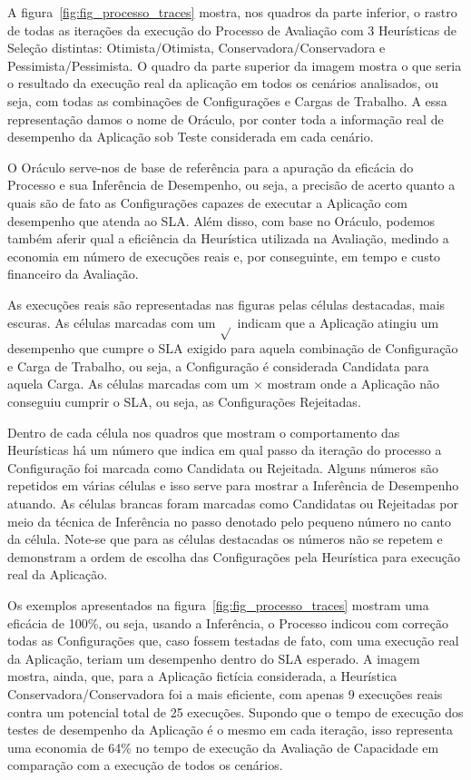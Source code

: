 A figura~\ref{fig:fig_processo_traces} mostra, nos quadros da parte inferior, 
o rastro de todas as iterações da execução do Processo de Avaliação com 3 
Heurísticas de Seleção distintas: Otimista/Otimista, Conservadora/Conservadora e 
Pessimista/Pessimista. O quadro da parte superior da imagem mostra o que seria o
resultado da execução real da aplicação em todos os cenários analisados, ou seja,
com todas as combinações de Configurações e Cargas de Trabalho. A essa 
representação damos o nome de Oráculo, por conter toda a informação real de
desempenho da Aplicação sob Teste considerada em cada cenário.

O Oráculo serve-nos de base de referência para a apuração da eficácia do Processo
e sua Inferência de Desempenho, ou seja, a precisão de acerto quanto a quais são
de fato as Configurações capazes de executar a Aplicação com desempenho que atenda
ao SLA. Além disso, com base no Oráculo, podemos também aferir qual a eficiência 
da Heurística utilizada na Avaliação, medindo a economia em número de execuções
reais e, por conseguinte, em tempo e custo financeiro da Avaliação.

As execuções reais são representadas nas figuras pelas células destacadas, mais 
escuras. As células marcadas com um $\sqrt{}$ indicam que a Aplicação atingiu um
desempenho que cumpre o SLA exigido para aquela combinação de Configuração e Carga
de Trabalho, ou seja, a Configuração é considerada Candidata para aquela Carga. As
células marcadas com um $\times$ mostram onde a Aplicação não conseguiu cumprir 
o SLA, ou seja, as Configurações Rejeitadas.

Dentro de cada célula nos quadros que mostram o comportamento das Heurísticas há
um número que indica em qual passo da iteração do processo a Configuração foi
marcada como Candidata ou Rejeitada. Alguns números são repetidos em várias células
e isso serve para mostrar a Inferência de Desempenho atuando. As células brancas
foram marcadas como Candidatas ou Rejeitadas por meio da técnica de Inferência no
passo denotado pelo pequeno número no canto da célula. Note-se que para as células 
destacadas os números não se repetem e demonstram a ordem de escolha das Configurações
pela Heurística para execução real da Aplicação.

Os exemplos apresentados na figura~\ref{fig:fig_processo_traces} mostram uma eficácia
de 100\%, ou seja, usando a Inferência, o Processo indicou com correção todas as
Configurações que, caso fossem testadas de fato, com uma execução real da Aplicação,
teriam um desempenho dentro do SLA esperado. A imagem mostra, ainda, que, para a 
Aplicação fictícia considerada, a Heurística Conservadora/Conservadora foi a mais
eficiente, com apenas 9 execuções reais contra um potencial total de 25 execuções.
Supondo que o tempo de execução dos testes de desempenho da Aplicação é o mesmo 
em cada iteração, isso representa uma economia de 64\% no tempo de execução da
Avaliação de Capacidade em comparação com a execução de todos os cenários.

